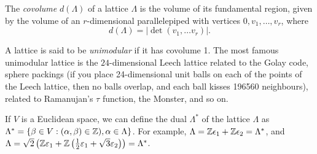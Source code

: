 The {\em covolume} $d(\Lambda)$ of a lattice $\Lambda$ is the volume of its
fundamental region, given by the volume of an $r$-dimensional parallelepiped
with vertices $0, v_1, \dots, v_r$, where
\[
    d(\Lambda) = |\det (v_1, \dots v_r)|.
\]

A lattice is said to be {\em unimodular} if it has covolume 1. The most famous
unimodular lattice is the $24$-dimensional Leech lattice related to the Golay
code, sphere packings (if you place 24-dimensional unit balls on each of the
points of the Leech lattice, then no balls overlap, and each ball kisses
196560 neighbours), related to Ramanujan's $\tau$ function, the Monster, and
so on.

If $V$ is a Euclidean space, we can define the dual $\Lambda^*$ of the lattice
$\Lambda$ as $\Lambda^* = \{\beta \in V : (\alpha, \beta) \in \mathbb{Z}),
\alpha \in \Lambda\}$.
For example, $\Lambda = \mathbb{Z}\epsilon_1 + \mathbb{Z}\epsilon_2 = \Lambda^*$, and
$\Lambda = \sqrt{2} \left( \mathbb{Z} \varepsilon_1 + \mathbb{Z} \left(
\frac{1}{2} \varepsilon_1 + \sqrt{3} \varepsilon_2\right) \right) = \Lambda^*$.

